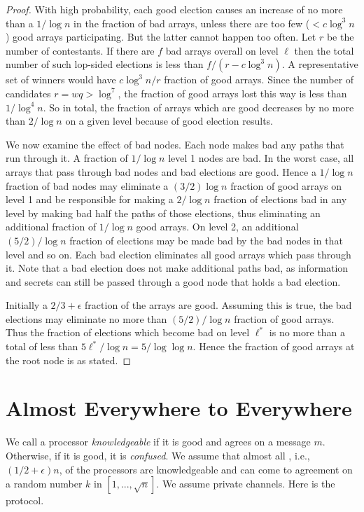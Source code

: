 \documentclass{sig-alternate}
\begin{document}
\begin{proof}
With high probability, each good election causes an increase of  no more than a $1/\log n$ in the fraction of bad arrays, unless
there are too few ($<  c \log^3 n$) good arrays participating.   But the latter cannot happen too often.  Let $r$ be the number of contestants.
 If there are $f$ bad arrays overall on level $\ell$ then the total number of such lop-sided elections  is less than $f/(r-c \log^ 3 n)$. A representative set
 of winners would have $c \log^3 n/ r$ fraction of good arrays. Since the number of candidates $r=wq > \log^7$, the fraction of good arrays lost this way is less  than $1/\log^4 n$.
   So in total, the fraction of arrays which are good decreases by no more than $2/\log  n$ on a given level because of good election results.

 We now examine the effect of bad nodes. Each node makes bad any paths that run through it.  A fraction of $1/\log n$ level 1 nodes are bad. In the worst case, all arrays that pass through bad nodes and bad elections are good. Hence  a $1/\log n$ fraction of  bad nodes may eliminate a
$(3/2)\log n$ fraction of good arrays on level 1 and be responsible for making a $2/\log n$ fraction of elections bad in any level  by making bad half the paths of those elections, thus eliminating an additional fraction of $1/\log n$ good arrays.  On level 2, an additional $(5/2)/\log n$ fraction of elections may be made bad by the bad nodes in that level and so on.  Each bad election eliminates all good arrays which pass through it. Note that a bad election does not make additional paths bad, as information and secrets can still be passed through a good node that holds a bad election. 

 Initially a $2/3 + \epsilon $ fraction of the arrays are good. Assuming this is true,  the bad elections  may eliminate no more than $(5/2)/\log n$ fraction of good arrays.  Thus the fraction of elections which become bad on level $\ell^*$  is no more than a total of less than $5 \ell^*/\log n=5/\log \log n$.  Hence the fraction of good arrays at the root node is as stated. 
\end{proof}  

\section{Almost Everywhere to Everywhere}\label{s:AE2E}
We call a processor {\it knowledgeable} if it is good and agrees on a message $m$.   Otherwise, if it is good, it is {\it confused}.  We assume that almost all , i.e., $(1/2+\epsilon )n$,  of the processors are  knowledgeable and can come to agreement on a random number  $k$ in $[1,...,\sqrt{n}]$. We assume private channels.  Here is the protocol.
\end{document}
